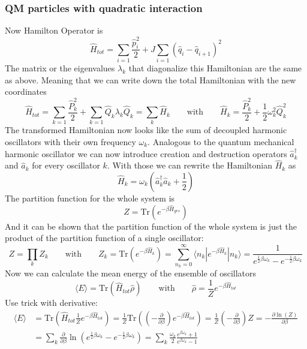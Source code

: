 	\subsubsection{QM particles with quadratic interaction}
	Now Hamilton Operator is
	\begin{equation}
		\hat{H}_{tot} =	\sum_{i = 1} \frac{\hat{p}_i^2}{2} + J \sum_{i = 1} (\hat{q}_i - \hat{q}_{i+1})^2
	\end{equation}
	The matrix or the eigenvalues $\lambda_k$ that diagonalize this Hamiltonian are the same as above. Meaning that we can write down the total Hamiltonian with the new coordinates
	\begin{equation}
		\hat{H}_{tot} =	\sum_{k = 1} \frac{\hat{P}_k^2}{2} + \sum_{k = 1} \hat{Q}_k \lambda_k \hat{Q}_{k} = \sum_k \hat{H}_k \qquad \text{with} \qquad \hat{H}_k =	\frac{\hat{P}_k^2}{2} + \frac{1}{2} \omega_k^2 \hat{Q}_k^2
	\end{equation}
	The transformed Hamiltonian now looks like the sum of decoupled harmonic oscillators with their own frequency $\omega_k$.
	Analogous to the quantum mechanical harmonic oscillator we can now introduce creation and destruction operators $\hat{a}^\dagger_k$ and $\hat{a}_k$ for every oscillator $k$. With those we can rewrite the Hamiltonian $\hat{H}_k$ as
	\begin{equation}
		\hat{H}_k =	\omega_k \left(\hat{a}^\dagger_k \hat{a}_k + \frac{1}{2}\right)
	\end{equation}
	The partition function for the whole system is
	\begin{equation}
		Z =	\text{Tr} \left(e^{-\beta \hat{H}_{ges}}\right)
	\end{equation}
	And it can be shown that the partition function of the whole system is just the product of the partition function of a single oscillator:
	\begin{equation}
		Z =	\prod_k Z_k \qquad \text{with} \qquad Z_k =	\text{Tr} \left(e^{-\beta \hat{H}_k}\right) =	\sum_{n_k =	0}^{\infty} \langle n_k | e^{-\beta \hat{H}_k} | n_k \rangle =	\frac{1}{e^{\frac{1}{2} \beta \omega_k} - e^{-\frac{1}{2}\beta \omega_k}}
	\end{equation}
	Now we can calculate the mean energy of the ensemble of oscillators
	\begin{equation}
		\langle E \rangle =	\text{Tr} \left(\hat{H}_{tot} \hat{\rho} \right) \qquad \text{with} \qquad \hat{\rho} = \frac{1}{Z} e^{-\beta \hat{H}_{tot}}
	\end{equation}
	Use trick with derivative:
	\begin{align}
		\langle E \rangle &=	\text{Tr} \left( \hat{H}_{tot} \frac{1}{Z} e^{-\beta \hat{H}_{tot}} \right) =	\frac{1}{Z} \text{Tr} \left( \left(-\frac{\partial}{\partial \beta}\right)e^{-\beta \hat{H}_{tot}} \right) =\frac{1}{Z}	\left(-\frac{\partial}{\partial \beta}\right) Z = - \frac{\partial \ln (Z)}{\partial \beta} \\
		&= \sum_k \frac{\partial}{\partial \beta} \ln \left(e^{\frac{1}{2} \beta \omega_k} - e^{-\frac{1}{2}\beta \omega_k}\right) =	\sum_k \frac{\omega_k}{2} \frac{e^{\beta \omega_k} + 1}{e^{\beta \omega_k} - 1}
	\end{align}
